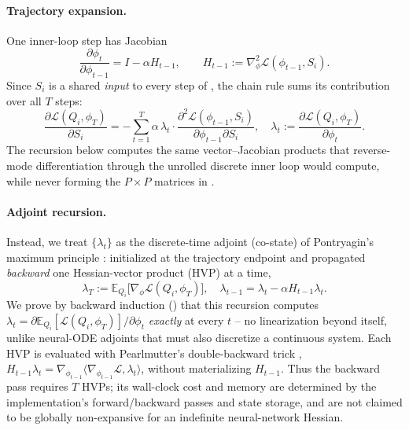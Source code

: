 \paragraph{Trajectory expansion.}
One inner-loop step has Jacobian
\begin{equation}
    \frac{\partial \phi_t}{\partial \phi_{t-1}} = I-\alpha H_{t-1},\qquad H_{t-1}:=\nabla^2_\phi \mathcal{L}(\phi_{t-1}, S_i).
    \label{eq:step_jacobian}
\end{equation}
Since $S_i$ is a shared \emph{input} to every step of , the chain rule sums its contribution over all $T$ steps:
\begin{equation}
    \frac{\partial\mathcal{L}(Q_i,\phi_T)}{\partial S_i} = -\sum_{t=1}^{T}\alpha\,\lambda_t\cdot\frac{\partial^2\mathcal{L}(\phi_{t-1},S_i)}{\partial\phi_{t-1}\partial S_i},\quad
    \lambda_t := \frac{\partial\mathcal{L}(Q_i,\phi_T)}{\partial\phi_t}.
    \label{eq:trajectory_expansion}
\end{equation}
The recursion below computes the same vector--Jacobian products that reverse-mode differentiation through the unrolled discrete inner loop would compute, while never forming the $P\times P$ matrices in .

\paragraph{Adjoint recursion.}
Instead, we treat $\{\lambda_t\}$ as the discrete-time adjoint (co-state) of Pontryagin's maximum principle \citep{pontryagin1962mathematical}: initialized at the trajectory endpoint and propagated \emph{backward} one Hessian-vector product (HVP) at a time,
\begin{equation}
    \lambda_T := \mathbb{E}_{Q_i}\!\big[\nabla_\phi\mathcal{L}(Q_i,\phi_T)\big],\quad
    \lambda_{t-1} = \lambda_t - \alpha H_{t-1}\lambda_t.
    \label{eq:adjoint_recursion}
\end{equation}
We prove by backward induction () that this recursion computes $\lambda_t=\partial\mathbb{E}_{Q_i}[\mathcal{L}(Q_i,\phi_T)]/\partial\phi_t$ \emph{exactly} at every $t$ -- no linearization beyond  itself, unlike neural-ODE adjoints that must also discretize a continuous system. Each HVP is evaluated with Pearlmutter's double-backward trick \citep{pearlmutter1994fast}, $H_{t-1}\lambda_t=\nabla_{\phi_{t-1}}\langle\nabla_{\phi_{t-1}}\mathcal{L},\lambda_t\rangle$, without materializing $H_{t-1}$. Thus the backward pass requires $T$ HVPs; its wall-clock cost and memory are determined by the implementation's forward/backward passes and state storage, and are not claimed to be globally non-expansive for an indefinite neural-network Hessian.

